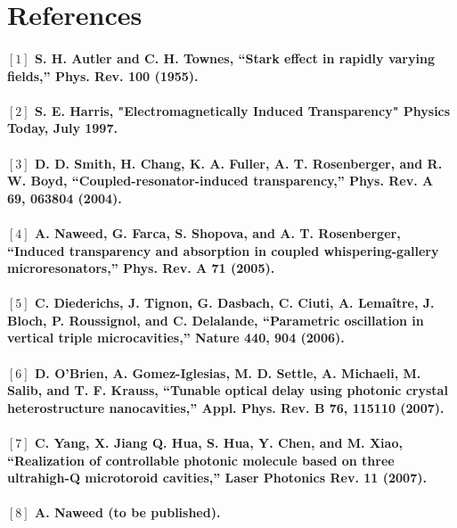 \newpage
\section*{References}

\paragraph{\normalfont \large $[1]$ S. H. Autler and C. H. Townes, “Stark effect in rapidly varying fields,” Phys. Rev. \textbf{100} (1955). \\ 
\\$[2]$ S. E. Harris, "Electromagnetically Induced Transparency" Physics Today, July 1997. \\
\\$[3]$ D. D. Smith, H. Chang, K. A. Fuller, A. T. Rosenberger, and R. W. Boyd, “Coupled-resonator-induced transparency,” Phys. Rev. A \textbf{69}, 063804 (2004). \\
\\$[4]$  A. Naweed, G. Farca, S. Shopova, and A. T. Rosenberger, “Induced transparency and absorption in coupled
whispering-gallery microresonators,” Phys. Rev. A \textbf{71} (2005).\\
\\$[5]$ C. Diederichs, J. Tignon, G. Dasbach, C. Ciuti, A. Lemaître, J. Bloch, P. Roussignol, and C. Delalande, “Parametric oscillation in vertical triple microcavities,” Nature \textbf{440}, 904 (2006).\\
\\$[6]$ D. O’Brien, A. Gomez-Iglesias, M. D. Settle, A. Michaeli, M. Salib, and T. F. Krauss, “Tunable optical delay using photonic crystal heterostructure nanocavities,” Appl. Phys. Rev. B \textbf{76}, 115110 (2007).\\
\\$[7]$ C. Yang,  X. Jiang Q. Hua, S. Hua, Y. Chen, and M. Xiao, “Realization of controllable photonic molecule based on three ultrahigh-Q microtoroid cavities,” Laser Photonics Rev. \textbf{11} (2007).\\
\\$[8]$ A. Naweed (to be published).}